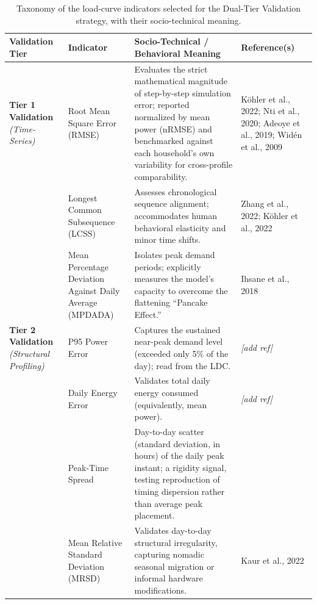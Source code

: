 \documentclass[final,3p,times,onecolumn]{elsarticle}
\begin{document}
\begin{table}[htbp]
\centering
\caption{Taxonomy of the load-curve indicators selected for the Dual-Tier Validation strategy, with their socio-technical meaning.}
\label{tab:indicator_selection}
\small
\renewcommand{\arraystretch}{1.3}
\begin{tabular}{>{\raggedright\arraybackslash}p{2.5cm} >{\raggedright\arraybackslash}p{3cm} >{\raggedright\arraybackslash}p{5.5cm} >{\raggedright\arraybackslash}p{3cm}}
\toprule
\textbf{Validation Tier} & \textbf{Indicator} & \textbf{Socio-Technical / Behavioral Meaning} & \textbf{Reference(s)} \\ 
\midrule
\textbf{Tier 1 Validation} \newline \textit{(Time-Series)} & Root Mean Square Error (RMSE) & Evaluates the strict mathematical magnitude of step-by-step simulation error; reported normalized by mean power (nRMSE) and benchmarked against each household's own variability for cross-profile comparability. & Köhler et al., 2022; Nti et al., 2020; Adeoye et al., 2019; Widén et al., 2009 \\
& Longest Common Subsequence (LCSS) & Assesses chronological sequence alignment; accommodates human behavioral elasticity and minor time shifts. & Zhang et al., 2022; Köhler et al., 2022 \\
& Mean Percentage Deviation Against Daily Average (MPDADA) & Isolates peak demand periods; explicitly measures the model's capacity to overcome the flattening ``Pancake Effect.'' & Ihsane et al., 2018 \\
\midrule
\textbf{Tier 2 Validation} \newline \textit{(Structural Profiling)} & P95 Power Error & Captures the sustained near-peak demand level (exceeded only 5\% of the day); read from the LDC. & \textit{[add ref]} \\
& Daily Energy Error & Validates total daily energy consumed (equivalently, mean power). & \textit{[add ref]} \\
& Peak-Time Spread & Day-to-day scatter (standard deviation, in hours) of the daily peak instant; a rigidity signal, testing reproduction of timing dispersion rather than average peak placement. & [add ref] \\
& Mean Relative Standard Deviation (MRSD) & Validates day-to-day structural irregularity, capturing nomadic seasonal migration or informal hardware modifications. & Kaur et al., 2022 \\
\bottomrule
\end{tabular}
\end{table}
\end{document}

